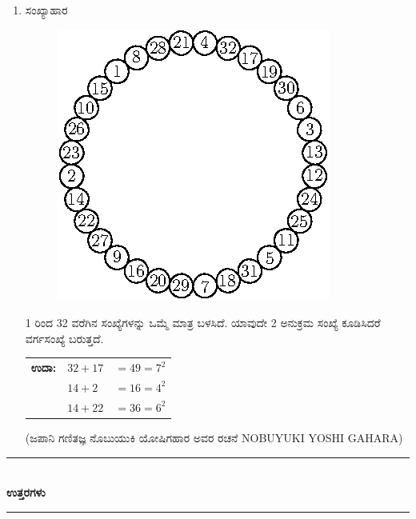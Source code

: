 \begin{enumerate}
\item ಸಂಖ್ಯಾಹಾರ
\begin{figure}[H]
\centering
\includegraphics{images/chap3/q30.eps}
\end{figure}

1 ರಿಂದ 32 ವರೆಗಿನ ಸಂಖ್ಯೆಗಳನ್ನು ಒಮ್ಮೆ ಮಾತ್ರ ಬಳಸಿದೆ. ಯಾವುದೇ 2 ಅನುಕ್ರಮ ಸಂಖ್ಯೆ ಕೂಡಿಸಿದರೆ ವರ್ಗಸಂಖ್ಯೆ ಬರುತ್ತದೆ. 

\smallskip
\begin{tabular}[t]{lll}
{\bf ಉದಾ:} & $32 + 17$ & $= 49 = 7^{2}$\\
& $14 + 2$ & $= 16 = 4^{2}$\\
& $14 + 22$ & $= 36 = 6^{2}$
\end{tabular}

\smallskip
(ಜಪಾನಿ ಗಣಿತಜ್ಞ ನೊಬುಯುಕಿ ಯೋಷಿಗಹಾರ ಅವರ ರಚನೆ NOBUYUKI YOSHI GAHARA)
\end{enumerate}

\smallskip

\begin{center}
\rule{5cm}{1pt}\\[3pt]
{\Large\bfseries ಉತ್ತರಗಳು}\\[-0.1cm]
\rule{5cm}{1pt}
\end{center}

